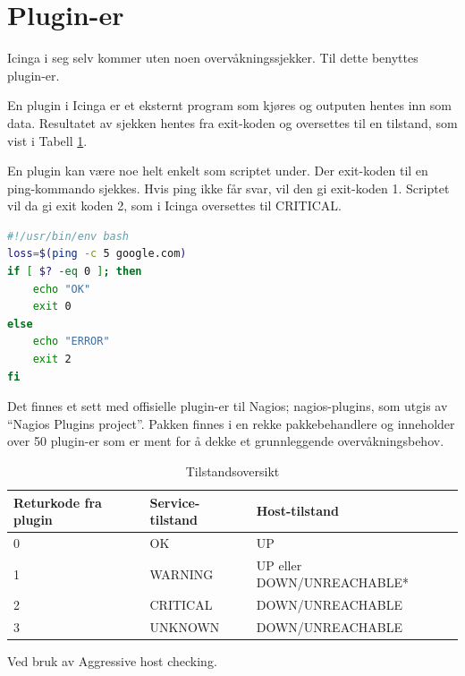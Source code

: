 \clearpage
\section{Plugin-er}
Icinga i seg selv kommer uten noen overvåkningssjekker. Til dette benyttes plugin-er.

En plugin i Icinga er et eksternt program som kjøres og outputen hentes inn som data. Resultatet av sjekken hentes fra exit-koden\cite{wiki:returncode} og oversettes til en tilstand, som vist i Tabell \ref{state}.

En plugin kan være noe helt enkelt som scriptet under. Der exit-koden til en ping-kommando sjekkes. Hvis ping ikke får svar, vil den gi exit-koden 1. Scriptet vil da gi exit koden 2, som i Icinga oversettes til CRITICAL.
\begin{lstlisting}[language=bash]
#!/usr/bin/env bash
loss=$(ping -c 5 google.com)
if [ $? -eq 0 ]; then
    echo "OK"
    exit 0
else
    echo "ERROR"
    exit 2
fi
\end{lstlisting}

Det finnes et sett med offisielle plugin-er til Nagios; nagios-plugins, som utgis av ``Nagios Plugins project''. Pakken finnes i en rekke pakkebehandlere og inneholder over 50 plugin-er som er ment for å dekke et grunnleggende overvåkningsbehov\cite{nagiosplugins}.

\begin{table}[H]
	\begin{center}
	\begin{threeparttable}
	\begin{tabular}{| l | l | l |} \hline
	\textbf{Returkode fra plugin} & \textbf{Service-tilstand} & \textbf{Host-tilstand} \\ \hline
	0 & OK & UP \\ \hline
	1 & WARNING & UP eller DOWN/UNREACHABLE* \\ \hline
	2 & CRITICAL & DOWN/UNREACHABLE \\ \hline
	3 & UNKNOWN & DOWN/UNREACHABLE \\ \hline
	\end{tabular}
	\begin{tablenotes}
	\small
	\item *Ved bruk av Aggressive host checking\cite{icingapluginapi}.
	\end{tablenotes}
	\caption{Tilstandsoversikt}
	\label{state}
	\end{threeparttable}
	\end{center}
\end{table}

